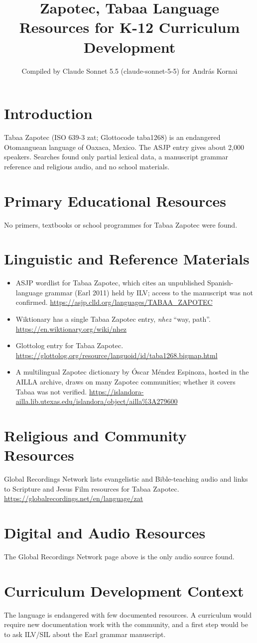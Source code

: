 \documentclass[12pt]{article}
\title{Zapotec, Tabaa Language Resources for K-12 Curriculum Development}
\author{Compiled by Claude Sonnet 5.5 (claude-sonnet-5-5) for Andr\'as Kornai}
\date{}
\begin{document}
\maketitle

\section{Introduction}
Tabaa Zapotec (ISO 639-3 zat; Glottocode taba1268) is an endangered Otomanguean language of Oaxaca, Mexico. The ASJP entry gives about 2,000 speakers. Searches found only partial lexical data, a manuscript grammar reference and religious audio, and no school materials.

\section{Primary Educational Resources}
No primers, textbooks or school programmes for Tabaa Zapotec were found.

\section{Linguistic and Reference Materials}
\begin{itemize}
\item ASJP wordlist for Tabaa Zapotec, which cites an unpublished Spanish-language grammar (Earl 2011) held by ILV; access to the manuscript was not confirmed. \url{https://asjp.clld.org/languages/TABAA_ZAPOTEC}
\item Wiktionary has a single Tabaa Zapotec entry, \emph{nhez} ``way, path''. \url{https://en.wiktionary.org/wiki/nhez}
\item Glottolog entry for Tabaa Zapotec. \url{https://glottolog.org/resource/languoid/id/taba1268.bigmap.html}
\item A multilingual Zapotec dictionary by \'Oscar M\'endez Espinoza, hosted in the AILLA archive, draws on many Zapotec communities; whether it covers Tabaa was not verified. \url{https://islandora-ailla.lib.utexas.edu/islandora/object/ailla%3A279600}
\end{itemize}

\section{Religious and Community Resources}
Global Recordings Network lists evangelistic and Bible-teaching audio and links to Scripture and Jesus Film resources for Tabaa Zapotec. \url{https://globalrecordings.net/en/language/zat}

\section{Digital and Audio Resources}
The Global Recordings Network page above is the only audio source found.

\section{Curriculum Development Context}
The language is endangered with few documented resources. A curriculum would require new documentation work with the community, and a first step would be to ask ILV/SIL about the Earl grammar manuscript.
\end{document}
